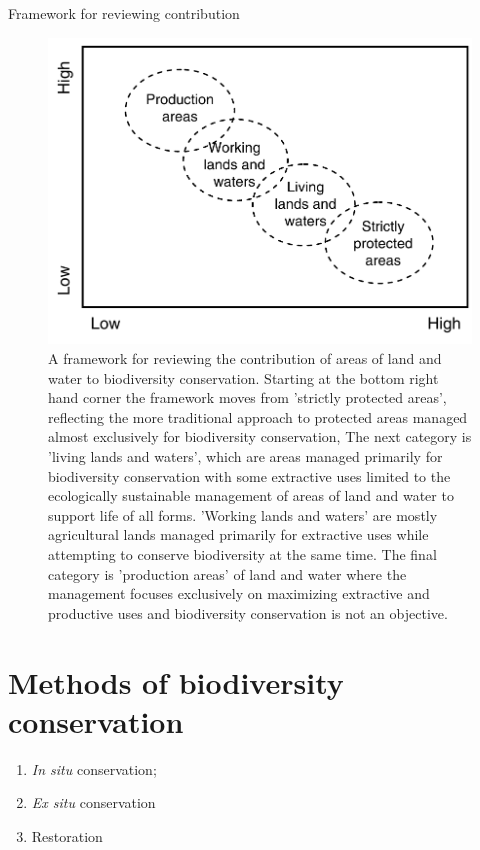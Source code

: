 \documentclass[ignorenonframetext,aspectratio=169]{beamer}
\providecommand{\tightlist}{%
  \setlength{\itemsep}{0pt}\setlength{\parskip}{0pt}}
\begin{document}
\begin{frame}{Framework for reviewing contribution}
\protect\hypertarget{framework-for-reviewing-contribution}{}

\begin{figure}
\includegraphics[width=0.45\linewidth]{./../images/contribution_review} \caption{A framework for reviewing the contribution of areas of land and water to biodiversity conservation. Starting at the bottom right hand corner the framework moves from 'strictly protected areas', reflecting the more traditional approach to protected areas managed almost exclusively for biodiversity conservation, The next category is 'living lands and waters', which are areas managed primarily for biodiversity conservation with some extractive uses limited to the ecologically sustainable management of areas of land and water to support life of all forms. 'Working lands and waters' are mostly agricultural lands managed primarily for extractive uses while attempting to conserve biodiversity at the same time. The final category is 'production areas' of land and water where the management focuses exclusively on maximizing extractive and productive uses and biodiversity conservation is not an objective.}\label{fig:contribution-review}
\end{figure}

\end{frame}

\hypertarget{methods-of-biodiversity-conservation}{%
\section{Methods of biodiversity
conservation}\label{methods-of-biodiversity-conservation}}

\begin{frame}{}
\protect\hypertarget{section-6}{}

\begin{enumerate}
\tightlist
\item
  \emph{In situ} conservation;
\item
  \emph{Ex situ} conservation
\item
  Restoration
\end{enumerate}

\end{frame}
\end{document}
